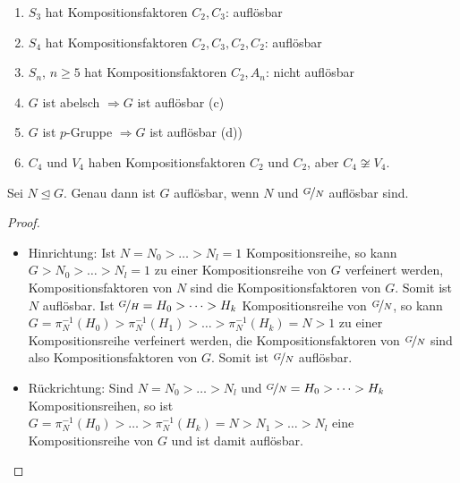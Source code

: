 \begin{example}
	\begin{enumerate}[label=(\alph*)]
		\item $S_3$ hat Kompositionsfaktoren $C_2, C_3$: auflösbar
		\item $S_4$ hat Kompositionsfaktoren $C_2,C_3,C_2,C_2$: auflösbar
		\item $S_n$, $n \geq 5$ hat Kompositionsfaktoren $C_2, A_n$: nicht auflösbar
		\item $G$ ist abelsch $\Longrightarrow G$ ist auflösbar (c)
		\item $G$ ist $p$-Gruppe $\Longrightarrow G$ ist auflösbar (d))
		\item $C_4 \text{ und } V_4$ haben Kompositionsfaktoren $C_2$ und $C_2$, aber $C_4 \not\cong V_4$.
	\end{enumerate}
\end{example}

\begin{lemma}
	Sei $N\unlhd G$. Genau dann ist $G$ auflösbar, wenn $N$ und $\nicefrac{G}{N}$ auflösbar sind.
\end{lemma}
\begin{proof}
	\begin{itemize}
		\item Hinrichtung: Ist $N = N_0 > \dots > N_l = 1$ Kompositionsreihe, so kann $G > N_0 > \dots > N_l = 1$ zu einer Kompositionsreihe von $G$ verfeinert werden, Kompositionsfaktoren von $N$ sind die Kompositionsfaktoren von $G$. Somit ist $N$ auflösbar. Ist $\nicefrac{G}{H} = H_0 > \dots > H_k$ Kompositionsreihe von $\nicefrac{G}{N}$, so kann $G = \pi^{-1}_{N}(H_0) > \pi^{-1}_{N}(H_1) > \dots > \pi^{-1}_{N}(H_k) = N > 1$ zu einer Kompositionsreihe verfeinert werden, die Kompositionsfaktoren von $\nicefrac{G}{N}$ sind also Kompositionsfaktoren von $G$. Somit ist $\nicefrac{G}{N}$ auflösbar.
		\item Rückrichtung: Sind $N = N_0 > \dots > N_l$ und $\nicefrac{G}{N}=H_0 > \dots > H_k$ Kompositionsreihen, so ist $G = \pi^{-1}_{N}(H_0) > \dots > \pi^{-1}_{N}(H_k) = N > N_1 > \dots > N_l$ eine Kompositionsreihe von $G$ und ist damit auflösbar.
	\end{itemize}
\end{proof}

